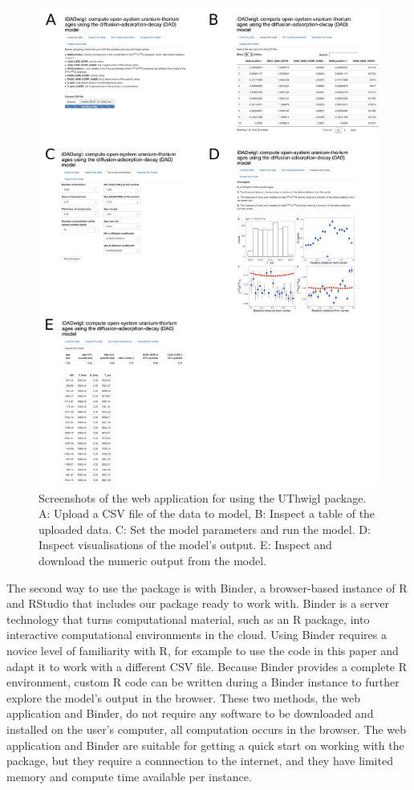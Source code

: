 \documentclass[]{elsarticle} %
\begin{document}
\begin{figure}
\includegraphics[width=0.95\linewidth]{figures/shiny-app-screenshots} \caption{Screenshots of the web application for using the UThwigl package. A: Upload a CSV file of the data to model, B: Inspect a table of the uploaded data. C: Set the model parameters and run the model. D: Inspect visualisations of the model's output. E: Inspect and download the numeric output from the model.}\label{fig:shinyfig}
\end{figure}

The second way to use the package is with Binder, a browser-based instance of R and RStudio that includes our package ready to work with. Binder is a server technology that turns computational material, such as an R package, into interactive computational environments in the cloud. Using Binder requires a novice level of familiarity with R, for example to use the code in this paper and adapt it to work with a different CSV file. Because Binder provides a complete R environment, custom R code can be written during a Binder instance to further explore the model's output in the browser. These two methods, the web application and Binder, do not require any software to be downloaded and installed on the user's computer, all computation occurs in the browser. The web application and Binder are suitable for getting a quick start on working with the package, but they require a connnection to the internet, and they have limited memory and compute time available per instance.
\end{document}
